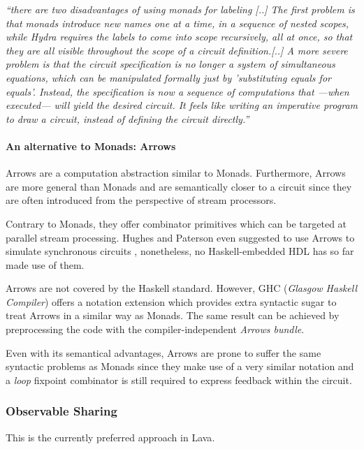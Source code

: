 \documentclass[a4paper,twoside,11pt]{article}
\begin{document}
\begin{body}
  
  \textit{``there are two disadvantages of using monads for labeling
    [..]  The first problem is that monads introduce new names
    one at a time, in a sequence of nested scopes, while Hydra
    requires the labels to come into scope recursively, all at once,
    so that they are all visible throughout the scope of a circuit
    definition.[..] A more severe problem is that the circuit
    specification is no longer a system of simultaneous equations,
    which can be manipulated formally just by 'substituting equals
    for equals'. Instead, the specification is now a sequence of
    computations that ---when executed--- will yield the desired circuit.
    It feels like writing an imperative program to draw a circuit,
    instead of defining the circuit directly.''}\cite{hydra:th}

  \paragraph{An alternative to Monads: Arrows\hfil}

  
  Arrows\cite{arrows} are a computation abstraction similar to Monads.
  Furthermore, Arrows are more general than Monads and are semantically
  closer to a circuit since they are often introduced from the
  perspective of stream processors. 

  Contrary to Monads, they offer combinator primitives which can be
  targeted at parallel stream processing. Hughes and Paterson even
  suggested to use Arrows to simulate synchronous circuits
  \cite{arrows:new,arrows:prog}, nonetheless, no Haskell-embedded HDL
  has so far made use of them.
  
  Arrows are not covered by the Haskell standard. However, GHC
  (\textit{Glasgow Haskell Compiler}) offers a notation
  extension\cite{arrows:new} which provides extra syntactic
  sugar to treat Arrows in a similar way as Monads. The same result
  can be achieved by preprocessing the code with the compiler-independent
  \textit{Arrows bundle}.

  Even with its semantical advantages, Arrows are prone to suffer the same
  syntactic problems as Monads since they make use of a very similar
  notation and a \textit{loop} fixpoint combinator is still
  required to express feedback within the circuit.
  
  \subsubsection{Observable Sharing}  
  This is the currently preferred approach in Lava\cite{osharing}.
  

\end{body}
\end{document}
